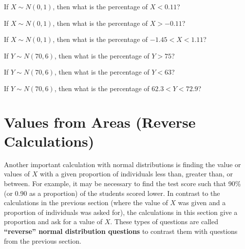 \documentclass[10pt,openany]{book}\usepackage[]{graphicx}\usepackage[]{color}
\begin{document}
\begin{exsection}
  \item \label{revex:quNormZ0.11} If $X\sim N(0,1)$, then what is the percentage of $X<0.11$? 
  \item \label{revex:quNormZm0.11} If $X\sim N(0,1)$, then what is the percentage of $X>-0.11$? 
  \item \label{revex:quNormZbtwn} If $X\sim N(0,1)$, then what is the percentage of $-1.45<X<1.11$? 
  \item \label{revex:quNormXgt75} If $Y\sim N(70,6)$, then what is the percentage of $Y>75$? 
  \item \label{revex:quNormXlt63} If $Y\sim N(70,6)$, then what is the percentage of $Y<63$? 
  \item \label{revex:quNormXbtwn} If $Y\sim N(70,6)$, then what is the percentage of $62.3<Y<72.9$? 
\end{exsection}


\section[Reverse Calculations]{Values from Areas (Reverse Calculations)}
Another important calculation with normal distributions is finding the value or values of $X$ with a given proportion of individuals less than, greater than, or between.  For example, it may be necessary to find the test score such that 90\% (or 0.90 as a proportion) of the students scored lower.  In contrast to the calculations in the previous section (where the value of $X$ was given and a proportion of individuals was asked for), the calculations in this section give a proportion and ask for a value of $X$.  These types of questions are called \textbf{``reverse'' normal distribution questions} to contrast them with questions from the previous section.
\end{document}
